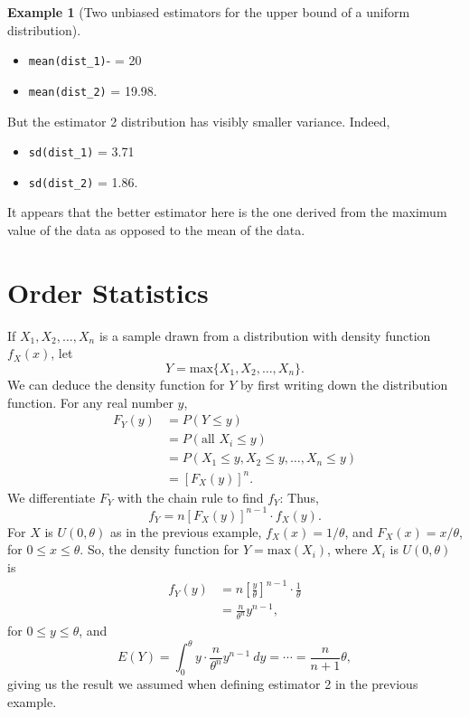 \documentclass[
]{book}
\providecommand{\tightlist}{%
  \setlength{\itemsep}{0pt}\setlength{\parskip}{0pt}}
\theoremstyle{definition}
\theoremstyle{definition}
\newtheorem{example}{Example}[chapter]
\theoremstyle{definition}
\theoremstyle{definition}
\theoremstyle{remark}
\begin{document}
\begin{example}[Two unbiased estimators for the upper bound of a uniform distribution]
\begin{itemize}
\tightlist
\item
  \texttt{mean(dist\_1)}- = 20
\item
  \texttt{mean(dist\_2)} = 19.98.
\end{itemize}

But the estimator 2 distribution has visibly smaller variance. Indeed,

\begin{itemize}
\tightlist
\item
  \texttt{sd(dist\_1)} = 3.71
\item
  \texttt{sd(dist\_2)} = 1.86.
\end{itemize}

It appears that the better estimator here is the one derived from the maximum value of the data as opposed to the mean of the data.
\end{example}

\section{Order Statistics}\label{order-statistics}

If \(X_1, X_2, \ldots, X_n\) is a sample drawn from a distribution with density function \(f_X(x)\), let \[Y = \text{max}\{X_1, X_2, \ldots, X_n\}.\]
We can deduce the density function for \(Y\) by first writing down the distribution function. For any real number \(y\),
\begin{align*}
F_Y(y) &= P(Y \leq y) \\
      &= P(\text{all }X_i \leq y) \\
      &= P(X_1 \leq y, X_2 \leq y, \ldots, X_n \leq y) \\
      &= \left[F_X(y)\right]^n.
\end{align*}
We differentiate \(F_Y\) with the chain rule to find \(f_Y\):
Thus, \[f_Y = n\left[F_X(y)\right]^{n-1}\cdot f_X(y). \tag{density for the max of sample}\]
For \(X\) is \(U(0,\theta)\) as in the previous example, \(f_X(x) = 1/\theta\), and \(F_X(x) = x/\theta\), for \(0 \leq x \leq \theta\). So, the density function for \(Y = \text{max}(X_i)\), where \(X_i\) is \(U(0,\theta)\) is
\begin{align*}
f_Y(y) &= n \left[\frac{y}{\theta}\right]^{n-1} \cdot \frac{1}{\theta}\\
      &= \frac{n}{\theta^n}y^{n-1},
\end{align*}
for \(0 \leq y \leq \theta\),
and \[E(Y) = \int_0^\theta y \cdot \frac{n}{\theta^n}y^{n-1}~dy = \cdots = \frac{n}{n+1}\theta,\]
giving us the result we assumed when defining estimator 2 in the previous example.
\end{document}
